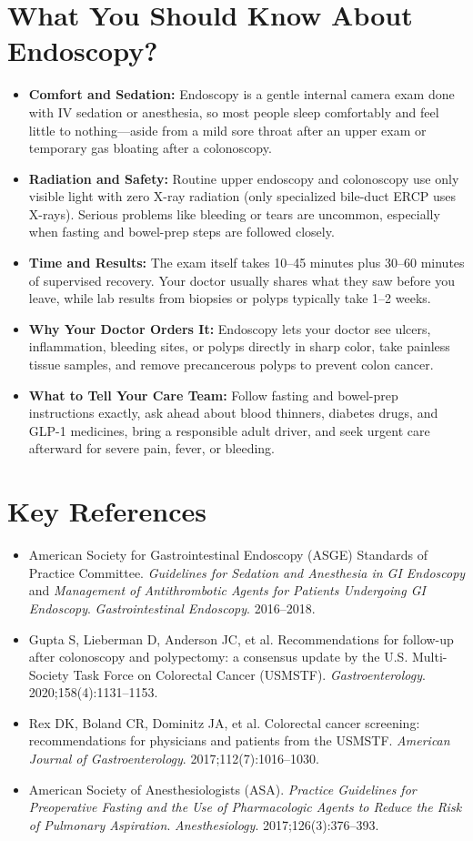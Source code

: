 \section{What You Should Know About Endoscopy?}
\begin{itemize}
\item \textbf{Comfort and Sedation:} Endoscopy is a gentle internal camera exam done with IV sedation or anesthesia, so most people sleep comfortably and feel little to nothing---aside from a mild sore throat after an upper exam or temporary gas bloating after a colonoscopy.
\item \textbf{Radiation and Safety:} Routine upper endoscopy and colonoscopy use only visible light with zero X-ray radiation (only specialized bile-duct ERCP uses X-rays). Serious problems like bleeding or tears are uncommon, especially when fasting and bowel-prep steps are followed closely.
\item \textbf{Time and Results:} The exam itself takes 10--45 minutes plus 30--60 minutes of supervised recovery. Your doctor usually shares what they saw before you leave, while lab results from biopsies or polyps typically take 1--2 weeks.
\item \textbf{Why Your Doctor Orders It:} Endoscopy lets your doctor see ulcers, inflammation, bleeding sites, or polyps directly in sharp color, take painless tissue samples, and remove precancerous polyps to prevent colon cancer.
\item \textbf{What to Tell Your Care Team:} Follow fasting and bowel-prep instructions exactly, ask ahead about blood thinners, diabetes drugs, and GLP-1 medicines, bring a responsible adult driver, and seek urgent care afterward for severe pain, fever, or bleeding.
\end{itemize}


\section{Key References}
\begin{itemize}
\item American Society for Gastrointestinal Endoscopy (ASGE) Standards of Practice Committee. \textit{Guidelines for Sedation and Anesthesia in GI Endoscopy} and \textit{Management of Antithrombotic Agents for Patients Undergoing GI Endoscopy}. \textit{Gastrointestinal Endoscopy}. 2016--2018.
\item Gupta S, Lieberman D, Anderson JC, et al. Recommendations for follow-up after colonoscopy and polypectomy: a consensus update by the U.S. Multi-Society Task Force on Colorectal Cancer (USMSTF). \textit{Gastroenterology}. 2020;158(4):1131--1153.
\item Rex DK, Boland CR, Dominitz JA, et al. Colorectal cancer screening: recommendations for physicians and patients from the USMSTF. \textit{American Journal of Gastroenterology}. 2017;112(7):1016--1030.
\item American Society of Anesthesiologists (ASA). \textit{Practice Guidelines for Preoperative Fasting and the Use of Pharmacologic Agents to Reduce the Risk of Pulmonary Aspiration}. \textit{Anesthesiology}. 2017;126(3):376--393.
\end{itemize}
